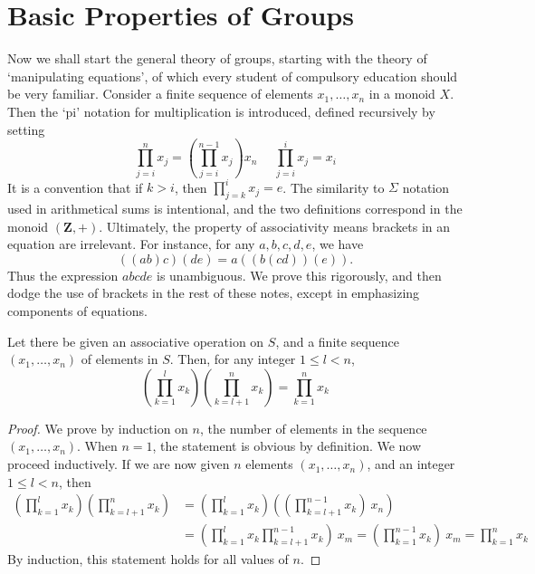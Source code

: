 \chapter{Basic Properties of Groups}

Now we shall start the general theory of groups, starting with the theory of `manipulating equations', of which every student of compulsory education should be very familiar. Consider a finite sequence of elements $x_1, \dots, x_n$ in a monoid $X$. Then the `pi' notation for multiplication is introduced, defined recursively by setting
%
\[ \prod_{j = i}^n x_j = \left( \prod_{j = i}^{n-1} x_j \right) x_n\ \ \ \ \ \ \prod_{j = i}^i x_j = x_i \]
%
It is a convention that if $k > i$, then $\prod_{j = k}^i x_j = e$. The similarity to $\Sigma$ notation used in arithmetical sums is intentional, and the two definitions correspond in the monoid $(\mathbf{Z}, +)$. Ultimately, the property of associativity means brackets in an equation are irrelevant. For instance, for any $a,b,c,d,e$, we have
%
\[ ((ab) c) (de) = a ((b (cd)) (e)). \]
%
Thus the expression $abcde$ is unambiguous. We prove this rigorously, and then dodge the use of brackets in the rest of these notes, except in emphasizing components of equations.

\begin{theorem}
Let there be given an associative operation on $S$, and a finite sequence $(x_1, \dots, x_n)$ of elements in $S$. Then, for any integer $1 \leq l < n$,
%
\[ \left( \prod_{k=1}^l x_k \right) \left( \prod_{k=l+1}^n x_k \right) = \prod_{k=1}^n x_k \]
\end{theorem}
\begin{proof}
    We prove by induction on $n$, the number of elements in the sequence $(x_1, \dots, x_n)$. When $n = 1$, the statement is obvious by definition. We now proceed inductively. If we are now given $n$ elements $(x_1, \dots, x_n)$, and an integer $1 \leq l < n$, then
    \begin{align*}
        \left( \prod_{k=1}^l x_k \right) \left( \prod_{k=l+1}^n x_k \right) &= \left( \prod_{k=1}^l x_k \right) \left( \left( \prod_{k=l+1}^{n-1} x_k \right)\ x_n \right)\\
        &= \left( \prod_{k=1}^l x_k \prod_{k=l+1}^{n-1} x_k \right)\ x_m = \left( \prod_{k=1}^{n-1} x_k \right)\ x_m = \prod_{k=1}^n x_k
    \end{align*}
    By induction, this statement holds for all values of $n$.
\end{proof}

